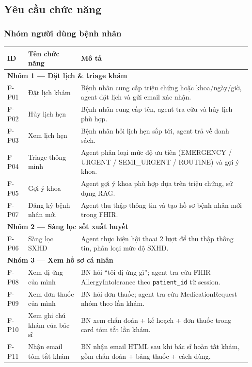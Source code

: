 \documentclass[a4paper,13pt,3p,oneside]{report}
\theoremstyle{definition}
\theoremstyle{remark}
\theoremstyle{definition}
\begin{document}
\subsection{Yêu cầu chức năng}

\subsubsection{Nhóm người dùng bệnh nhân}

\begin{table}[H]
\centering
\begin{tabular}{|l|p{4cm}|p{8cm}|}
\hline
\textbf{ID} & \textbf{Tên chức năng} & \textbf{Mô tả} \\
\hline
\multicolumn{3}{|l|}{\textbf{Nhóm 1 --- Đặt lịch \& triage khám}} \\
\hline
F-P01 & Đặt lịch khám & Bệnh nhân cung cấp triệu chứng hoặc khoa/ngày/giờ, agent đặt lịch và gửi email xác nhận. \\
\hline
F-P02 & Hủy lịch hẹn & Bệnh nhân cung cấp tên, agent tra cứu và hủy lịch phù hợp. \\
\hline
F-P03 & Xem lịch hẹn & Bệnh nhân hỏi lịch hẹn sắp tới, agent trả về danh sách. \\
\hline
F-P04 & Triage thông minh & Agent phân loại mức độ ưu tiên (EMERGENCY / URGENT / SEMI\_URGENT / ROUTINE) và gợi ý khoa. \\
\hline
F-P05 & Gợi ý khoa & Agent gợi ý khoa phù hợp dựa trên triệu chứng, sử dụng RAG. \\
\hline
F-P07 & Đăng ký bệnh nhân mới & Agent thu thập thông tin và tạo hồ sơ bệnh nhân mới trong FHIR. \\
\hline
\multicolumn{3}{|l|}{\textbf{Nhóm 2 --- Sàng lọc sốt xuất huyết}} \\
\hline
F-P06 & Sàng lọc SXHD & Agent thực hiện hội thoại 2 lượt để thu thập thông tin, phân loại mức độ SXHD. \\
\hline
\multicolumn{3}{|l|}{\textbf{Nhóm 3 --- Xem hồ sơ cá nhân}} \\
\hline
F-P08 & Xem dị ứng của mình & BN hỏi ``tôi dị ứng gì''; agent tra cứu FHIR AllergyIntolerance theo \texttt{patient\_id} từ session. \\
\hline
F-P09 & Xem đơn thuốc của mình & BN hỏi đơn thuốc; agent tra cứu MedicationRequest nhóm theo lần khám. \\
\hline
F-P10 & Xem ghi chú khám của bác sĩ & BN xem chẩn đoán + kế hoạch + đơn thuốc trong card tóm tắt lần khám. \\
\hline
F-P11 & Nhận email tóm tắt khám & BN nhận email HTML sau khi bác sĩ hoàn tất khám, gồm chẩn đoán + bảng thuốc + cách dùng. \\

\end{tabular}
\end{table}
\end{document}
